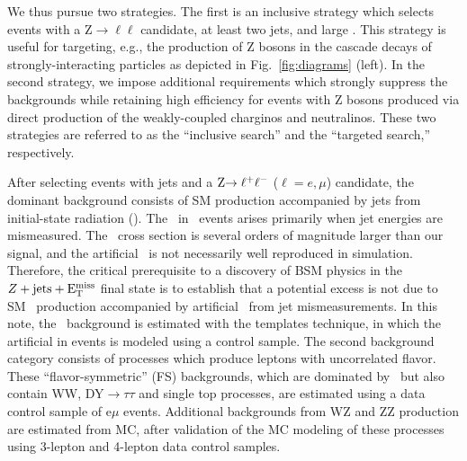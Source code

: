 We thus pursue two strategies. The first is an inclusive strategy which selects events with a Z$\to\ell\ell$ candidate,
at least two jets, and large \MET. This strategy is useful for targeting, e.g., the production of Z bosons in the 
cascade decays of strongly-interacting particles as depicted in Fig.~\ref{fig:diagrams} (left). In the second strategy,
we impose additional requirements which strongly suppress the backgrounds while retaining high efficiency for events
with Z bosons produced via direct production of the weakly-coupled charginos and neutralinos. 
These two strategies are referred to as the ``inclusive search'' and the ``targeted search,'' respectively.

After selecting events with jets and a $\Z\to\ell^+\ell^-$ ($\ell=e,\mu$) candidate,
the dominant background consists of SM \Z production accompanied by jets from initial-state radiation (\zjets).
The \MET\ in \zjets\ events arises primarily when jet energies are mismeasured.
The \zjets\ cross section is several orders of magnitude larger
than our signal, and the artificial \MET\ is not necessarily well reproduced in simulation.
Therefore, the critical prerequisite to a discovery of BSM physics in the $Z+\rm{jets}+\rm{E_{T}^{miss}}$ final state is 
to establish that a potential excess is not due to SM \zjets\ production accompanied by artificial 
\MET\ from jet mismeasurements. In this note, the \zjets\ background is estimated with the \MET templates technique,
in which the artificial \MET in \zjets events is modeled using a \gjets control sample.
The second background category consists of processes which produce leptons with uncorrelated flavor. 
These ``flavor-symmetric'' (FS) backgrounds, which are dominated by \ttbar\ but also contain WW, DY$\to\tau\tau$
and single top processes, are estimated using a data control sample of e$\mu$ events.
Additional backgrounds from WZ and ZZ production are estimated from MC, after validation of the MC modeling
of these processes using 3-lepton and 4-lepton data control samples.

